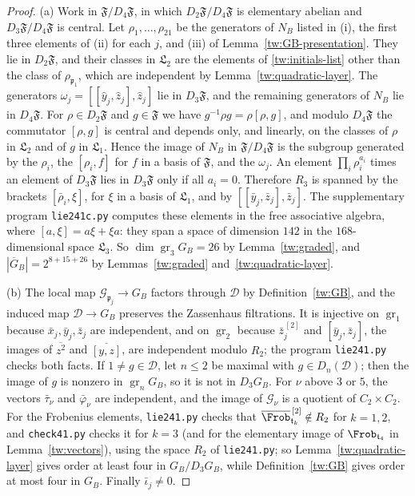 \begin{proof}
(a) Work in $\mathfrak F/D_4\mathfrak F$, in which $D_2\mathfrak F/D_4\mathfrak F$
is elementary abelian and $D_3\mathfrak F/D_4\mathfrak F$ is central. Let
$\rho_1,\dots,\rho_{21}$ be the generators of $N_B$ listed in (i), the first
three elements of (ii) for each $j$, and (iii) of
Lemma~\ref{tw:GB-presentation}. They lie in $D_2\mathfrak F$, and their classes
in $\mathfrak L_2$ are the elements of \eqref{tw:initials-list} other than the
class of $\rho_{\mathfrak p_1}$, which are independent by
Lemma~\ref{tw:quadratic-layer}. The generators
$\omega_j=[[\hat y_j,\hat z_j],\hat z_j]$ lie in $D_3\mathfrak F$, and the
remaining generators of $N_B$ lie in $D_4\mathfrak F$. For $\rho\in D_2\mathfrak F$ and $g\in\mathfrak F$ we have
$g^{-1}\rho g=\rho[\rho,g]$, and modulo $D_4\mathfrak F$ the commutator
$[\rho,g]$ is central and depends only, and linearly, on the classes of
$\rho$ in $\mathfrak L_2$ and of $g$ in $\mathfrak L_1$. Hence the image of
$N_B$ in $\mathfrak F/D_4\mathfrak F$ is the subgroup generated by the $\rho_i$,
the $[\rho_i,f]$ for $f$ in a basis of $\mathfrak F$, and the $\omega_j$. An
element $\prod_i\rho_i^{a_i}$ times an element of $D_3\mathfrak F$ lies in
$D_3\mathfrak F$ only if all $a_i=0$. Therefore $R_3$ is spanned by the
brackets $[\bar\rho_i,\xi]$, for $\xi$ in a basis of $\mathfrak L_1$, and by
$[[\bar y_j,\bar z_j],\bar z_j]$. The supplementary program
\texttt{lie241c.py} computes these elements in the free associative algebra,
where $[a,\xi]=a\xi+\xi a$: they span a space of dimension $142$ in the
$168$-dimensional space $\mathfrak L_3$. So $\dim\operatorname{gr}_3G_B=26$
by Lemma~\ref{tw:graded}, and $|\overline G_B|=2^{8+15+26}$ by
Lemmas~\ref{tw:graded} and~\ref{tw:quadratic-layer}.

(b) The local map $\mathcal G_{\mathfrak p_j}\to G_B$ factors through $\mathcal D$ by
Definition~\ref{tw:GB}, and the induced map $\mathcal D\to G_B$ preserves the
Zassenhaus filtrations. It is injective on $\operatorname{gr}_1$ because
$\bar x_j,\bar y_j,\bar z_j$ are independent, and on $\operatorname{gr}_2$
because $\bar z_j^{\,[2]}$ and $[\bar y_j,\bar z_j]$, the images of
$\overline{z^2}$ and $\overline{[y,z]}$, are independent modulo $R_2$; the
program \texttt{lie241.py} checks both facts. If $1\neq g\in \mathcal D$, let $n\le2$
be maximal with $g\in D_n(\mathcal D)$; then the image of $g$ is nonzero in
$\operatorname{gr}_nG_B$, so it is not in $D_3G_B$. For $\nu$ above $3$ or
$5$, the vectors $\bar\tau_\nu$ and $\bar\varphi_\nu$ are independent, and the
image of $\mathcal G_\nu$ is a quotient of $C_2\times C_2$. For the Frobenius
elements, \texttt{lie241.py} checks that
$\overline{\Frob}_{\mathfrak t_k}^{\,[2]}\notin R_2$ for $k=1,2$, and
\texttt{check41.py} checks it for $k=3$ (and for the elementary image of
$\Frob_{\mathfrak t_4}$ in Lemma~\ref{tw:vectors}),
using the space $R_2$ of \texttt{lie241.py}; so
Lemma~\ref{tw:quadratic-layer} gives order at least four in $G_B/D_3G_B$,
while Definition~\ref{tw:GB} gives order at most four in $G_B$. Finally
$\bar\iota_j\neq0$.


\end{proof}
